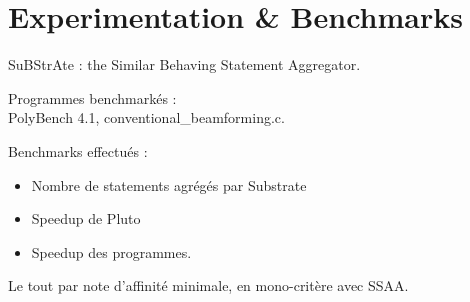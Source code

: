 \documentclass[5pt, compress]{beamer}
\makeatletter
\newcommand*{\currentname}{\@currentlabelname}
\makeatother
\begin{document}
\section{Experimentation \& Benchmarks}
    \begin{frame}{\currentname}
        SuBStrAte : the Similar Behaving Statement Aggregator.
        \bigskip
       
        Programmes benchmarkés :\\
        PolyBench 4.1, conventional\_beamforming.c.
        \pause

        \bigskip

        Benchmarks effectués :
        \vspace{-1.5em}
        \begin{itemize}\itemsep0em
            \item Nombre de statements agrégés par Substrate
            \item Speedup de Pluto
            \item Speedup des programmes.
        \end{itemize}
        \vspace{-1em}
        Le tout par note d'affinité minimale, en mono-critère avec SSAA.
        

    \end{frame}
\end{document}
